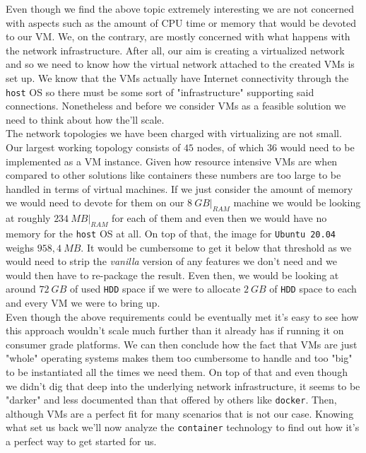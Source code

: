             Even though we find the above topic extremely interesting we are not concerned with aspects such as the amount of CPU time or memory that would be devoted to our VM. We, on the contrary, are mostly concerned with what happens with the network infrastructure. After all, our aim is creating a virtualized network and so we need to know how the virtual network attached to the created VMs is set up. We know that the VMs actually have Internet connectivity through the \texttt{host} OS so there must be some sort of "infrastructure" supporting said connections. Nonetheless and before we consider VMs as a feasible solution we need to think about how the'll scale.\\

            The network topologies we have been charged with virtualizing are not small. Our largest working topology consists of $45$ nodes, of which $36$ would need to be implemented as a VM instance. Given how resource intensive VMs are when compared to other solutions like containers these numbers are too large to be handled in terms of virtual machines. If we just consider the amount of memory we would need to devote for them on our $8\ GB\bigr\rvert_{RAM}$ machine we would be looking at roughly $234\ MB\bigr\rvert_{RAM}$ for each of them and even then we would have no memory for the \texttt{host} OS at all. On top of that, the image for \texttt{Ubuntu 20.04} weighs $958,4\ MB$. It would be cumbersome to get it below that threshold as we would need to strip the \textit{vanilla} version of any features we don't need and we would then have to re-package the result. Even then, we would be looking at around $72\ GB$ of used \texttt{HDD} space if we were to allocate $2\ GB$ of \texttt{HDD} space to each and every VM we were to bring up.\\

            Even though the above requirements could be eventually met it's easy to see how this approach wouldn't scale much further than it already has if running it on consumer grade platforms. We can then conclude how the fact that VMs are just "whole" operating systems makes them too cumbersome to handle and too "big" to be instantiated all the times we need them. On top of that and even though we didn't dig that deep into the underlying network infrastructure, it seems to be "darker" and less documented than that offered by others like \texttt{docker}. Then, although VMs are a perfect fit for many scenarios that is not our case. Knowing what set us back we'll now analyze the \texttt{container} technology to find out how it's a perfect way to get started for us.

